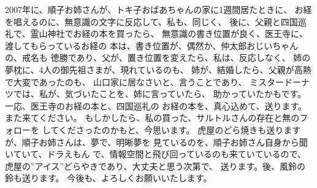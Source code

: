 \documentclass{jsarticle}
\begin{document}
\title{}
\author{}
\date{}
\maketitle

     2007年に、順子お姉さんが、トキ子おばあちゃんの家に1週間居たときに、
     お経を唱えるのに、無意識の文字に反応して、私も、同じく、
     後に、父親と四国巡礼で、霊山神社でお経の本を買ったら、
     無意識の書き位置が良く、医王寺に、渡してもらっているお経の
     本は、書き位置が、偶然か、仲太郎おじいちゃんの、戒名も
     徳勝であり、父が、置き位置を変えたら、私は、反応しなく、
     姉の夢枕に、4人の御先祖さまが、現れているのも、
     姉が、結婚したら、父親が高熱で大変であったのも、
     山口家に居なさいと、言うことであり、
     ミスタードーナツでは、私が、気づいたことを、姉に言っていたら、
     助かっていたかもです。一応、医王寺のお経の本と、四国巡礼の
     お経の本を、真心込めて、送ります。また来てください。
     もしかしたら、私の買った、サルトルさんの存在と無のフォローを
     してくださったのかもと、今思います。
     虎屋のどら焼きも送りますが、順子お姉さんは、夢で、明晰夢を
     見ているのを、順子お姉さん自身から聞いていて、ドラえもん
     で、情報空間と飛び回っているのも来ていているので、
     虎屋の”アイス”どらやきであり、大丈夫と思う次第で、
     送ります。後、風鈴の鈴も送ります。
     今後も、よろしくお願いいたします。
\end{document}
